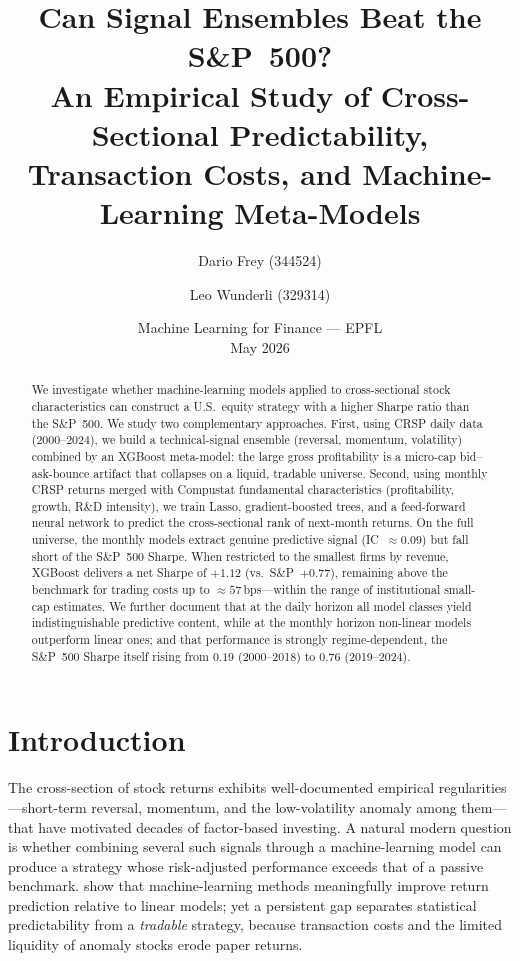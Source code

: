 \documentclass[11pt,a4paper]{article}
\title{Can Signal Ensembles Beat the S\&P~500?\\[0.35em]
  \large An Empirical Study of Cross-Sectional Predictability, Transaction
  Costs, and Machine-Learning Meta-Models}
\author{Dario Frey (344524) \and Leo Wunderli (329314)}
\date{Machine Learning for Finance --- EPFL\\ May 2026}
\begin{document}
\maketitle

\begin{abstract}
\noindent
We investigate whether machine-learning models applied to cross-sectional
stock characteristics can construct a U.S.\ equity strategy with a higher
Sharpe ratio than the S\&P~500. We study two complementary approaches. First,
using CRSP daily data (2000--2024), we build a technical-signal ensemble
(reversal, momentum, volatility) combined by an XGBoost meta-model: the large
gross profitability is a micro-cap bid--ask-bounce artifact that collapses
on a liquid, tradable universe. Second, using monthly CRSP returns merged
with Compustat fundamental characteristics (profitability, growth, R\&D
intensity), we train Lasso, gradient-boosted trees, and a feed-forward neural
network to predict the cross-sectional rank of next-month returns. On the full
universe, the monthly models extract genuine predictive signal
(IC~$\approx 0.09$) but fall short of the S\&P~500 Sharpe. When restricted
to the smallest firms by revenue, XGBoost delivers a net Sharpe of $+1.12$
(vs.\ S\&P~$+0.77$), remaining above the benchmark for trading costs up to
$\approx 57$\,bps---within the range of institutional small-cap estimates. We
further document that at the daily horizon all model classes yield
indistinguishable predictive content, while at the monthly horizon non-linear
models outperform linear ones; and that performance is strongly
regime-dependent, the S\&P~500 Sharpe itself rising from $0.19$ (2000--2018)
to $0.76$ (2019--2024).
\end{abstract}

\section{Introduction}
\label{sec:intro}

The cross-section of stock returns exhibits well-documented empirical
regularities---short-term reversal, momentum, and the low-volatility anomaly
among them---that have motivated decades of factor-based investing. A natural
modern question is whether combining several such signals through a
machine-learning model can produce a strategy whose risk-adjusted performance
exceeds that of a passive benchmark. \citet{gu2020} show that machine-learning
methods meaningfully improve return prediction relative to linear models; yet a
persistent gap separates statistical predictability from a \emph{tradable}
strategy, because transaction costs and the limited liquidity of anomaly stocks
erode paper returns.
\end{document}
